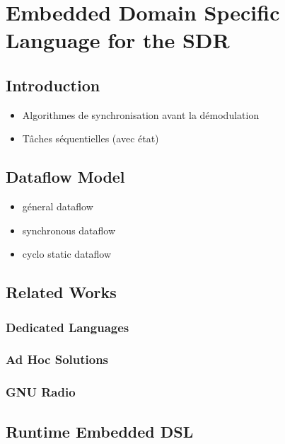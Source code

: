 \graphicspath{{main/chapter3/fig/}}

\chapter{Embedded Domain Specific Language for the SDR}

\section{Introduction}

\begin{itemize}
  \item Algorithmes de synchronisation avant la démodulation
  \item Tâches séquentielles (avec état)
\end{itemize}

\section{Dataflow Model}

\begin{itemize}
  \item géneral dataflow
  \item synchronous dataflow
  \item cyclo static dataflow
\end{itemize}

\section{Related Works}

\subsection{Dedicated Languages}

\subsection{Ad Hoc Solutions}

\subsection{GNU Radio}

\section{Runtime Embedded DSL}

